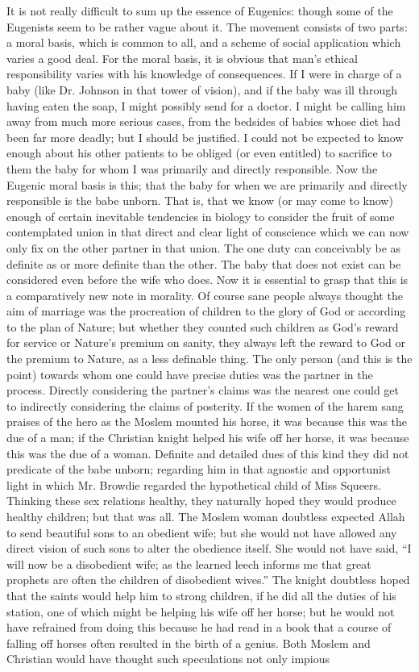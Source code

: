 \documentclass{book}
\begin{document}
It is not really difficult to sum up the essence of Eugenics: though some of the Eugenists seem to be rather vague about it. The movement consists of two parts: a moral basis, which is common to all, and a scheme of social application which varies a good deal. For the moral basis, it is obvious that man’s ethical responsibility varies with his knowledge of consequences. If I were in charge of a baby (like Dr. Johnson in that tower of vision), and if the baby was ill through having eaten the soap, I might possibly send for a doctor. I might be calling him away from much more serious cases, from the bedsides of babies whose diet had been far more deadly; but I should be justified. I could not be expected to know enough about his other patients to be obliged (or even entitled) to sacrifice to them the baby for whom I was primarily and directly responsible. Now the Eugenic moral basis is this; that the baby for when we are primarily and directly responsible is the babe unborn. That is, that we know (or may come to know) enough of certain inevitable tendencies in biology to consider the fruit of some contemplated union in that direct and clear light of conscience which we can now only fix on the other partner in that union. The one duty can conceivably be as definite as or more definite than the other. The baby that does not exist can be considered even before the wife who does. Now it is essential to grasp that this is a comparatively new note in morality. Of course sane people always thought the aim of marriage was the procreation of children to the glory of God or according to the plan of Nature; but whether they counted such children as God’s reward for service or Nature’s premium on sanity, they always left the reward to God or the premium to Nature, as a less definable thing. The only person (and this is the point) towards whom one could have precise duties was the partner in the process. Directly considering the partner’s claims was the nearest one could get to indirectly considering the claims of posterity. If the women of the harem sang praises of the hero as the Moslem mounted his horse, it was because this was the due of a man; if the Christian knight helped his wife off her horse, it was because this was the due of a woman. Definite and detailed dues of this kind they did not predicate of the babe unborn; regarding him in that agnostic and opportunist light in which Mr. Browdie regarded the hypothetical child of Miss Squeers. Thinking these sex relations healthy, they naturally hoped they would produce healthy children; but that was all. The Moslem woman doubtless expected Allah to send beautiful sons to an obedient wife; but she would not have allowed any direct vision of such sons to alter the obedience itself. She would not have said, “I will now be a disobedient wife; as the learned leech informs me that great prophets are often the children of disobedient wives.” The knight doubtless hoped that the saints would help him to strong children, if he did all the duties of his station, one of which might be helping his wife off her horse; but he would not have refrained from doing this because he had read in a book that a course of falling off horses often resulted in the birth of a genius. Both Moslem and Christian would have thought such speculations not only impious 
\end{document}

